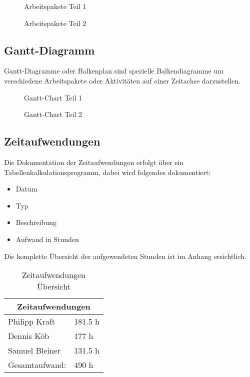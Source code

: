 \begin{figure}[H]
  \centering
  \caption{Arbeitspakete Teil 1}
\end{figure}

\begin{figure}[H]
  \centering
  \caption{Arbeitspakete Teil 2}
\end{figure}

\subsection{Gantt-Diagramm}
Gantt-Diagramme oder Balkenplan sind spezielle Balkendiagramme um verschiedene
Arbeitspakete oder Aktivitäten auf einer Zeitachse darzustellen.

\clearpage \newpage
\begin{sidewaysfigure}[htbp]
  \centering
  \caption{Gantt-Chart Teil 1}
\end{sidewaysfigure}

\begin{sidewaysfigure}[htbp]
  \centering
  \caption{Gantt-Chart Teil 2}
\end{sidewaysfigure}
\clearpage

\subsection{Zeitaufwendungen}

Die Dokumentation der Zeitaufwendungen erfolgt über ein
Tabellenkalkulationsprogramm, dabei wird folgendes dokumentiert:

\begin{itemize}
  \item Datum
  \item Typ
  \item Beschreibung
  \item Aufwand in Stunden
\end{itemize}

Die komplette Übersicht der aufgewendeten Stunden ist im Anhang ersichtlich.

\begin{table}[H]
  \centering
  \begin{tabular}{@{}ll@{}}
  \toprule
  \multicolumn{2}{c}{\textbf{Zeitaufwendungen}} \\ \midrule
  Philipp Kraft             & 181.5 h           \\
  Dennis Köb                & 177 h             \\
  Samuel Bleiner            & 131.5 h           \\ \midrule
  Gesamtaufwand:            & 490 h             \\ \bottomrule
  \end{tabular}
  \caption{Zeitaufwendungen Übersicht}
\end{table}